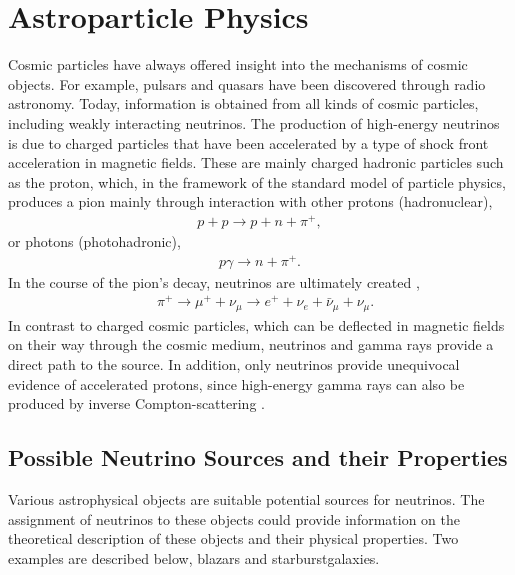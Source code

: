 \chapter{Astroparticle Physics} \label{sec:astro}

Cosmic particles have always offered insight into the mechanisms of cosmic objects.
For example, pulsars and quasars have been discovered through radio astronomy.
Today, information is obtained from all kinds of cosmic particles, including weakly interacting neutrinos.
The production of high-energy neutrinos is due to charged particles that have been accelerated by a type of shock front acceleration in magnetic fields.
These are mainly charged hadronic particles such as the proton, which, in the framework of the standard model of particle physics, produces a pion mainly through interaction with other protons (hadronuclear),
\begin{align}
  p+p \rightarrow p+n+\pi^+,
\end{align}
or photons (photohadronic),
\begin{align}
  p\gamma \rightarrow n+\pi^+.
\end{align}
In the course of the pion's decay, neutrinos are ultimately created \cite{pdg},
\begin{align}
  &\pi^+ \rightarrow \mu^++\nu_\mu \rightarrow e^++\nu_e+\bar{\nu}_\mu+\nu_\mu.
\end{align}
In contrast to charged cosmic particles, which can be deflected in magnetic fields on their way through the cosmic medium, neutrinos and gamma rays provide a direct path to the source.
In addition, only neutrinos provide unequivocal evidence of accelerated protons, since high-energy gamma rays can also be produced by inverse Compton-scattering \cite{spiering}.


\section{Possible Neutrino Sources and their Properties}

Various astrophysical objects are suitable potential sources for neutrinos.
The assignment of neutrinos to these objects could provide information on the theoretical description of these objects and their physical properties.
Two examples are described below, blazars and starburstgalaxies.

